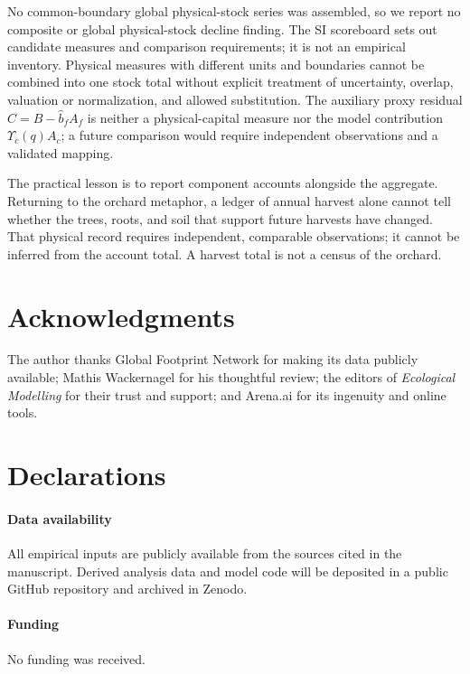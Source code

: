 \documentclass[preprint,12pt,authoryear]{elsarticle}
\newcommand{\Ups}{\Upsilon_c}
\begin{document}
\begin{samepage}
No common-boundary global physical-stock series was assembled, so we report no composite or global physical-stock decline finding. The SI scoreboard sets out candidate measures and comparison requirements; it is not an empirical inventory. Physical measures with different units and boundaries cannot be combined into one stock total without explicit treatment of uncertainty, overlap, valuation or normalization, and allowed substitution. The auxiliary proxy residual $C=B-\hat b_fA_f$ is neither a physical-capital measure nor the model contribution $\Ups(q)A_c$; a future comparison would require independent observations and a validated mapping.\par
\end{samepage}

The practical lesson is to report component accounts alongside the aggregate. Returning to the orchard metaphor, a ledger of annual harvest alone cannot tell whether the trees, roots, and soil that support future harvests have changed. That physical record requires independent, comparable observations; it cannot be inferred from the account total. A harvest total is not a census of the orchard.

\section*{Acknowledgments}

The author thanks Global Footprint Network for making its data publicly available; Mathis Wackernagel for his thoughtful review; the editors of \emph{Ecological Modelling} for their trust and support; and Arena.ai for its ingenuity and online tools.

\section*{Declarations}

\paragraph{Data availability} All empirical inputs are publicly available from the sources cited in the manuscript. Derived analysis data and model code will be deposited in a public GitHub repository and archived in Zenodo.

\paragraph{Funding} No funding was received.
\end{document}
